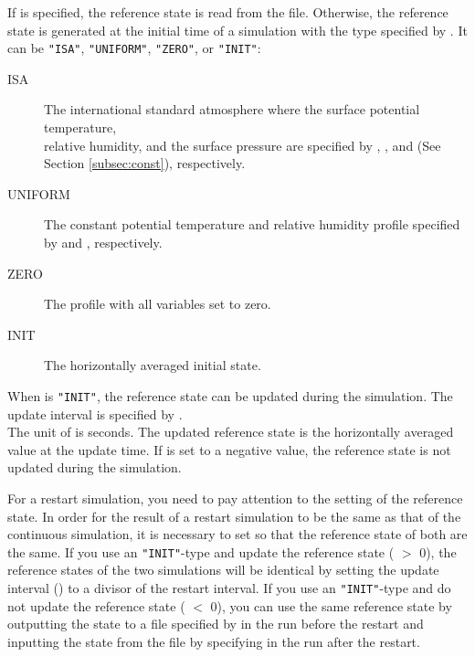 If  is specified, the reference state is read from the file.
Otherwise, the reference state is generated at the initial time of a simulation with the type specified by .
It can be \verb|"ISA"|, \verb|"UNIFORM"|, \verb|"ZERO"|, or \verb|"INIT"|:
\begin{description}
\item[ISA]
  The international standard atmosphere where the surface potential temperature, \\
  relative humidity, and the surface pressure are specified by , , and  (See Section \ref{subsec:const}), respectively.
\item[UNIFORM]
  The constant potential temperature and relative humidity profile specified \\
  by  and , respectively.
\item[ZERO]
  The profile with all variables set to zero.
\item[INIT]
  The horizontally averaged initial state.
\end{description}

When  is \verb|"INIT"|,
the reference state can be updated during the simulation.
The update interval is specified by . \\The unit of  is seconds.
The updated reference state is the horizontally averaged value at the update time.
If  is set to a negative value, the reference state is not updated during the simulation.


For a restart simulation, you need to pay attention to the setting of the reference state.
In order for the result of a restart simulation to be the same as that of the continuous simulation,
it is necessary to set so that the reference state of both are the same.
%
If you use an \verb|"INIT"|-type and update the reference state ( $>$ 0),
the reference states of the two simulations will be identical
by setting the update interval () to a divisor of the restart interval.
%
If you use an \verb|"INIT"|-type and do not update the reference state ( $<$ 0),
you can use the same reference state by outputting the state to a file specified by  in the run before the restart and inputting the state from the file by specifying  in the run after the restart.

